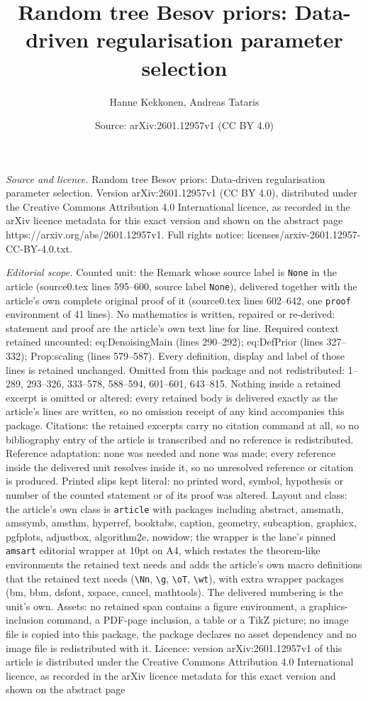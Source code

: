 \documentclass[10pt,a4paper]{amsart}
\title[Random tree Besov priors: Data-driven regularisation paramet]{Random tree Besov priors: Data-driven regularisation parameter selection}
\author{Hanne Kekkonen, Andreas Tataris}
\date{Source: arXiv:2601.12957v1 (CC BY 4.0)}
\begin{document}
\maketitle

\noindent\emph{Source and licence.} Random tree Besov priors: Data-driven regularisation parameter selection. Version arXiv:2601.12957v1 (CC BY 4.0), distributed under the Creative Commons Attribution 4.0 International licence, as recorded in the arXiv licence metadata for this exact version and shown on the abstract page https://arxiv.org/abs/2601.12957v1. Full rights notice: licenses/arxiv-2601.12957-CC-BY-4.0.txt.\par\smallskip

\noindent\textit{Editorial scope.} Counted unit: the Remark whose source label is \texttt{None} in the article (source0.tex lines 595--600, source label \texttt{None}), delivered together with the article's own complete original proof of it (source0.tex lines 602--642, one \texttt{proof} environment of 41 lines). No mathematics is written, repaired or re-derived: statement and proof are the article's own text line for line. Required context retained uncounted: eq:DenoisingMain (lines 290--292); eq:DefPrior (lines 327--332); Prop:scaling (lines 579--587). Every definition, display and label of those lines is retained unchanged. Omitted from this package and not redistributed: 1--289, 293--326, 333--578, 588--594, 601--601, 643--815. Nothing inside a retained excerpt is omitted or altered: every retained body is delivered exactly as the article's lines are written, so no omission receipt of any kind accompanies this package. Citations: the retained excerpts carry no citation command at all, so no bibliography entry of the article is transcribed and no reference is redistributed. Reference adaptation: none was needed and none was made; every reference inside the delivered unit resolves inside it, so no unresolved reference or citation is produced. Printed slips kept literal: no printed word, symbol, hypothesis or number of the counted statement or of its proof was altered. Layout and class: the article's own class is \texttt{article} with packages including abstract, amsmath, amssymb, amsthm, hyperref, booktabs, caption, geometry, subcaption, graphicx, pgfplots, adjustbox, algorithm2e, nowidow; the wrapper is the lane's pinned \texttt{amsart} editorial wrapper at 10pt on A4, which restates the theorem-like environments the retained text needs and adds the article's own macro definitions that the retained text needs (\texttt{\textbackslash Nn}, \texttt{\textbackslash g}, \texttt{\textbackslash oT}, \texttt{\textbackslash wt}), with extra wrapper packages (bm, bbm, dsfont, xspace, cancel, mathtools). The delivered numbering is the unit's own. Assets: no retained span contains a figure environment, a graphics-inclusion command, a PDF-page inclusion, a table or a TikZ picture; no image file is copied into this package, the package declares no asset dependency and no image file is redistributed with it. Licence: version arXiv:2601.12957v1 of this article is distributed under the Creative Commons Attribution 4.0 International licence, as recorded in the arXiv licence metadata for this exact version and shown on the abstract page 
\end{document}
